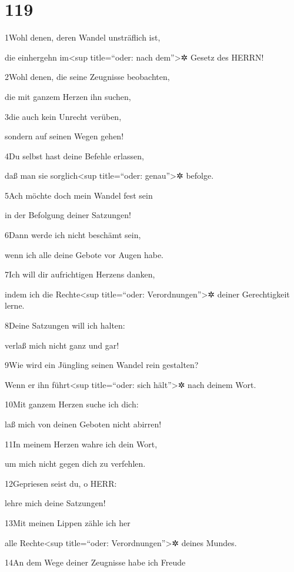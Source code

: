 \hypertarget{section-118}{%
\section{119}\label{section-118}}

1Wohl denen, deren Wandel unsträflich ist,

die einhergehn im\textless sup title=``oder: nach dem''\textgreater✲
Gesetz des HERRN!

2Wohl denen, die seine Zeugnisse beobachten,

die mit ganzem Herzen ihn suchen,

3die auch kein Unrecht verüben,

sondern auf seinen Wegen gehen!

4Du selbst hast deine Befehle erlassen,

daß man sie sorglich\textless sup title=``oder: genau''\textgreater✲
befolge.

5Ach möchte doch mein Wandel fest sein

in der Befolgung deiner Satzungen!

6Dann werde ich nicht beschämt sein,

wenn ich alle deine Gebote vor Augen habe.

7Ich will dir aufrichtigen Herzens danken,

indem ich die Rechte\textless sup title=``oder:
Verordnungen''\textgreater✲ deiner Gerechtigkeit lerne.

8Deine Satzungen will ich halten:

verlaß mich nicht ganz und gar!

9Wie wird ein Jüngling seinen Wandel rein gestalten?

Wenn er ihn führt\textless sup title=``oder: sich hält''\textgreater✲
nach deinem Wort.

10Mit ganzem Herzen suche ich dich:

laß mich von deinen Geboten nicht abirren!

11In meinem Herzen wahre ich dein Wort,

um mich nicht gegen dich zu verfehlen.

12Gepriesen seist du, o HERR:

lehre mich deine Satzungen!

13Mit meinen Lippen zähle ich her

alle Rechte\textless sup title=``oder: Verordnungen''\textgreater✲
deines Mundes.

14An dem Wege deiner Zeugnisse habe ich Freude

